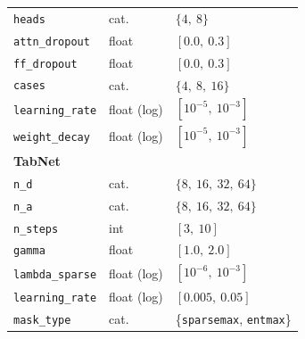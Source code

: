\begin{table}[htbp]
\begin{tabular}{lll}
\texttt{heads}          & cat.  & $\{4,\ 8\}$ \\
\texttt{attn\_dropout}  & float & $[0.0,\ 0.3]$ \\
\texttt{ff\_dropout}    & float & $[0.0,\ 0.3]$ \\
\texttt{cases}          & cat.  & $\{4,\ 8,\ 16\}$ \\
\texttt{learning\_rate} & float (log) & $[10^{-5},\ 10^{-3}]$ \\
\texttt{weight\_decay}  & float (log) & $[10^{-5},\ 10^{-3}]$ \\
\midrule
\multicolumn{3}{l}{\textbf{TabNet}} \\
\texttt{n\_d}           & cat.  & $\{8,\ 16,\ 32,\ 64\}$ \\
\texttt{n\_a}           & cat.  & $\{8,\ 16,\ 32,\ 64\}$ \\
\texttt{n\_steps}       & int   & $[3,\ 10]$ \\
\texttt{gamma}          & float & $[1.0,\ 2.0]$ \\
\texttt{lambda\_sparse} & float (log) & $[10^{-6},\ 10^{-3}]$ \\
\texttt{learning\_rate} & float (log) & $[0.005,\ 0.05]$ \\
\texttt{mask\_type}     & cat.  & \{\texttt{sparsemax},
  \texttt{entmax}\} \\
\bottomrule
\end{tabular}
\end{table}

